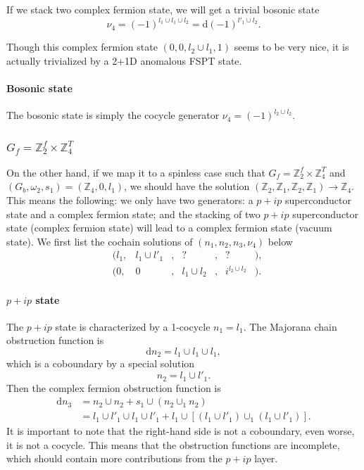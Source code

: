 \documentclass[%
 reprint,
 amsmath,amssymb,
 aps,
prb,
]{revtex4-2}
\begin{document}
If we stack two complex fermion state, we will get a trivial bosonic state 
\begin{equation}
\nu_4 = (-1)^{l_1 \cup l_1 \cup l_2} = \mathrm{d} (-1)^{l'_1 \cup l_2} .
\end{equation}

Though this complex fermion state $(0, 0, l_2 \cup l_1, 1)$ seems to be very nice, it is actually trivialized by a 2+1D anomalous FSPT state.

\paragraph{Bosonic state} The bosonic state is simply the cocycle generator $\nu_4 = (-1)^{l_2 \cup l_2}$.



\subsubsection{$G_f = \mathbb Z_2^f \times \mathbb Z_4^T$}

On the other hand, if we map it to a spinless case such that $G_f = \mathbb Z_2^f \times \mathbb Z_4^T$ and $(G_b, \omega_2, s_1) = (\mathbb Z_4, 0, l_1)$, we should have the solution $(\mathbb Z_2, \mathbb Z_1, \mathbb Z_2, \mathbb Z_1) \rightarrow \mathbb Z_4$.
This means the following: we only have two generators: a $p+ip$ superconductor state and a complex fermion state; and the stacking of two $p+ip$ superconductor state (complex fermion state) will lead to a complex fermion state (vacuum state).
We first list the cochain solutions of $(n_1, n_2, n_3, \nu_4)$ below 
\begin{align}
&(l_1 ,& l_1 \cup l'_1 &, & ? &,& ? &) ,\\
&(0 ,& 0 &, & l_1 \cup l_2 &,& i^{l_2 \cup l_2} &) .
\end{align}

\paragraph{$p+ip$ state}
The $p+ip$ state is characterized by a 1-cocycle $n_1 = l_1$.
The Majorana chain obstruction function is 
\begin{equation}
\mathrm{d} n_2 = l_1 \cup l_1 \cup l_1 ,
\end{equation}
which is a coboundary by a special solution
\begin{equation}
n_2 = l_1 \cup l'_1 .
\end{equation}
Then the complex fermion obstruction function is 
\begin{align}
\mathrm{d} n_3 &= n_2 \cup n_2 + s_1 \cup (n_2 \cup_1 n_2) \\
&= l_1 \cup l'_1 \cup l_1 \cup l'_1 + l_1 \cup \left[ (l_1 \cup l'_1) \cup_1 (l_1 \cup l'_1) \right] \nonumber . 
\end{align}
It is important to note that the right-hand side is not a coboundary, even worse, it is not a cocycle.
This means that the obstruction functions are incomplete, which should contain more contributions from the $p+ip$ layer.
\end{document}
